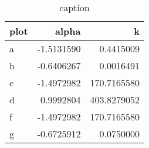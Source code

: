 \begin{table}
\centering
\begin{tabular}{lrr}
  \hline
plot & alpha & k \\ 
  \hline
a & -1.5131590 & 0.4415009 \\ 
  b & -0.6406267 & 0.0016491 \\ 
  c & -1.4972982 & 170.7165580 \\ 
  d & 0.9992804 & 403.8279052 \\ 
  f & -1.4972982 & 170.7165580 \\ 
  g & -0.6725912 & 0.0750000 \\ 
   \hline
\end{tabular}
\caption{caption} 
\label{tab:fitting_insideLambda_firstModel_phi0_nm400_dynamic_randomBipartite_allowUnlinked}
\end{table}
